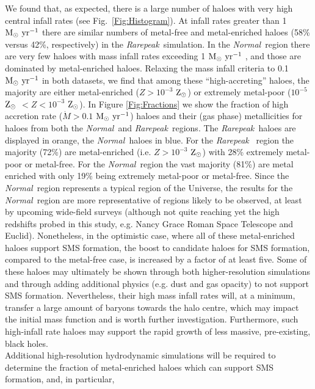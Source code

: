 \documentclass[graphics, twocolumn, usenatbib]{mn2e}
\newcommand{\msolaryr} {$\rm{M_{\odot}~yr^{-1}}~$}
\newcommand{\msolaryrc} {$\rm{M_{\odot}~yr^{-1}}$}
\newcommand{\zsolar} {$\rm{Z_{\odot}}~$}
\newcommand{\zsolarc} {$\rm{Z_{\odot}}$}
\newcommand{\rarepeak} {\textit{Rarepeak~}}
\newcommand{\normal} {\textit{Normal~}}
\begin{document}
\indent We found that, as expected, there is a large number of haloes with
very high central infall rates (see Fig.~\ref{Fig:Histogram}). At infall rates
greater than 1 \msolaryr there are similar numbers of metal-free and metal-enriched haloes
(58\% versus 42\%, respectively) in the \rarepeak simulation. In the \normal region there are very few haloes with mass
infall rates exceeding 1 \msolaryr, and those are dominated by metal-enriched haloes. Relaxing the
mass infall criteria to 0.1 \msolaryr in both datasets, we find that among these ``high-accreting''
haloes, the majority are either metal-enriched ($Z > 10^{-3}$ \zsolarc) or
extremely metal-poor ($10^{-5}$ \zsolar $ < Z < 10^{-3}$ \zsolarc). In Figure \ref{Fig:Fractions}
we show the fraction of high accretion rate ($\dot{M} > 0.1$ \msolaryrc) haloes and
their (gas phase) metallicities for haloes from both the \normal and \rarepeak regions.
The \rarepeak haloes are displayed in orange, the \normal haloes in blue. For the \rarepeak
region the majority (72\%) are metal-enriched (i.e. $Z > 10^{-3}$ \zsolarc) with 28\% extremely
metal-poor or metal-free. For the \normal region the vast
majority (81\%) are metal enriched with only 19\% being extremely metal-poor or metal-free.
Since the \normal region represents a typical
region of the Universe, the results for the \normal region are more representative of 
regions likely to be observed, at least by upcoming wide-field surveys (although not quite
reaching yet the high redshifts probed in this study, e.g. Nancy Grace Roman Space Telescope and Euclid). Nonetheless, 
in the optimistic case, where all of these metal-enriched haloes support SMS formation, the boost to
candidate haloes for SMS formation, compared to the metal-free case, is increased by a factor of
at least five. Some of these haloes may ultimately be shown through both  higher-resolution simulations and through adding additional physics (e.g. dust and gas opacity) 
to not support SMS formation. Nevertheless, their high mass infall rates will, at a minimum, transfer
a large amount of baryons towards the halo centre, which may impact the initial mass function and
is worth further investigation. Furthermore, such high-infall rate haloes may support the rapid
growth of less massive, pre-existing, black holes. \\
\indent Additional high-resolution hydrodynamic simulations will be required to
determine the fraction of metal-enriched haloes which can support SMS formation, and, in particular,
\end{document}
